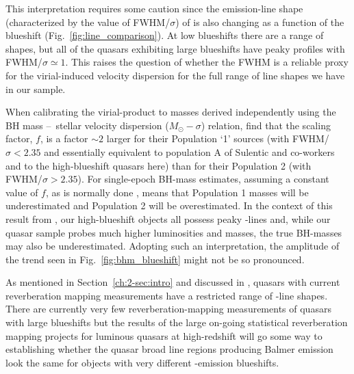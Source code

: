 This interpretation requires some caution since the emission-line shape (characterized by the value of FWHM/$\sigma$) of \ha is also changing as a function of the  blueshift (Fig.~\ref{fig:line_comparison}). 
At low  blueshifts there are a range of shapes, but all of the quasars exhibiting large  blueshifts have peaky \ha profiles with FWHM/$\sigma \simeq 1$. 
This raises the question of whether the \ha FWHM is a reliable proxy for the virial-induced velocity dispersion for the full range of \ha line shapes we have in our sample. 

When calibrating the virial-product to masses derived independently using the BH mass \---\ stellar velocity dispersion ($M_\odot-\sigma$) relation, \citet{collin06} find that the scaling factor, $f$, is a factor $\sim2$ larger for their Population `1' sources (with FWHM/$\sigma < 2.35$ and essentially equivalent to population A of Sulentic and co-workers and to the high-blueshift quasars here) than for their Population 2 (with FWHM/$\sigma > 2.35$). 
For single-epoch BH-mass estimates, assuming a constant value of $f$, as is normally done \citep[e.g.][]{vestergaard06}, means that Population 1 masses will be underestimated and Population 2 will be overestimated.
In the context of this result from \citet{collin06}, our high-blueshift objects all possess peaky \hans-lines and, while our quasar sample probes much higher luminosities and masses, the true BH-masses may also be underestimated.
Adopting such an interpretation, the amplitude of the trend seen in Fig.~\ref{fig:bhm_blueshift} might not be so pronounced.

As mentioned in Section~\ref{ch:2-sec:intro} and discussed in \citet{richards11}, quasars with current reverberation mapping measurements have a restricted range of -line shapes. 
There are currently very few reverberation-mapping measurements of quasars with large  blueshifts but the results of the large on-going statistical reverberation mapping projects \citep[e.g.][]{shen15} for luminous quasars at high-redshift will go some way to establishing whether the quasar broad line regions producing Balmer emission look the same for objects with very different -emission blueshifts. 

